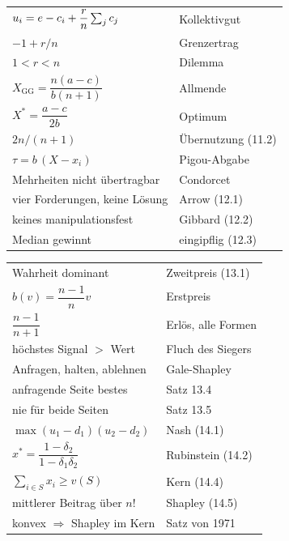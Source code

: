 \begin{merksatz}
\begin{center}
{\small
\renewcommand{\arraystretch}{1.62}
\begin{tabular}{@{}P{4.4cm}P{4.2cm}@{}}
\toprule
$u_i = e-c_i+\dfrac rn\sum_j c_j$ & Kollektivgut\\
$-1+r/n$ & Grenzertrag\\
$1<r<n$ & Dilemma\\
$X_{\text{GG}} = \dfrac{n(a-c)}{b(n+1)}$ & Allmende\\
$X^{*} = \dfrac{a-c}{2b}$ & Optimum\\
$2n/(n+1)$ & Übernutzung (11.2)\\
$\tau = b\,(X-x_i)$ & Pigou-Abgabe\\
\midrule
Mehrheiten nicht übertragbar & Condorcet\\
vier Forderungen, keine Lösung & Arrow (12.1)\\
keines manipulationsfest & Gibbard (12.2)\\
Median gewinnt & eingipflig (12.3)\\
\bottomrule
\end{tabular}}
\end{center}
\end{merksatz}

\begin{merksatz}
\begin{center}
{\small
\renewcommand{\arraystretch}{1.62}
\begin{tabular}{@{}P{4.4cm}P{4.2cm}@{}}
\toprule
Wahrheit dominant & Zweitpreis (13.1)\\
$b(v) = \dfrac{n-1}{n}v$ & Erstpreis\\
$\dfrac{n-1}{n+1}$ & Erlös, alle Formen\\
höchstes Signal $>$ Wert & Fluch des Siegers\\
Anfragen, halten, ablehnen & Gale-Shapley\\
anfragende Seite bestes & Satz 13.4\\
nie für beide Seiten & Satz 13.5\\
\midrule
$\max (u_1-d_1)(u_2-d_2)$ & Nash (14.1)\\
$x^{*} = \dfrac{1-\delta_2}{1-\delta_1\delta_2}$ & Rubinstein (14.2)\\
$\sum_{i\in S}x_i \ge v(S)$ & Kern (14.4)\\
mittlerer Beitrag über $n!$ & Shapley (14.5)\\
konvex $\Rightarrow$ Shapley im Kern & Satz von 1971\\
\bottomrule
\end{tabular}}
\end{center}
\end{merksatz}

